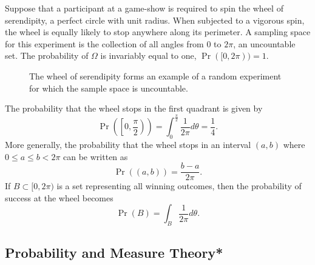 \begin{example}
Suppose that a participant at a game-show is required to spin the wheel of serendipity, a perfect circle with unit radius.
When subjected to a vigorous spin, the wheel is equally likely to stop anywhere along its perimeter.
A sampling space for this experiment is the collection of all angles from $0$ to $2 \pi$, an uncountable set.
The probability of $\Omega$ is invariably equal to one, $\Pr ([0, 2 \pi)) = 1$.

\begin{figure}[tbh!]
\begin{center}
\caption{The wheel of serendipity forms an example of a random experiment for which the sample space is uncountable.}
\end{center}
\end{figure}

The probability that the wheel stops in the first quadrant is given by
\begin{equation*}
\Pr \left( \left[ 0, \frac{\pi}{2} \right) \right)
= \int_{0}^{\frac{\pi}{2}} \frac{1}{2 \pi} d\theta
= \frac{1}{4}.
\end{equation*}
More generally, the probability that the wheel stops in an interval $(a, b)$ where $0 \leq a \leq b < 2 \pi$ can be written as
\begin{equation*}
\Pr ((a,b)) = \frac{b - a}{2 \pi}.
\end{equation*}
If $B \subset [0, 2 \pi)$ is a set representing all winning outcomes, then the probability of success at the wheel becomes
\begin{equation*}
\Pr(B) = \int_B \frac{1}{2 \pi} d\theta .
\end{equation*}
\end{example}


\subsection{Probability and Measure Theory*}

